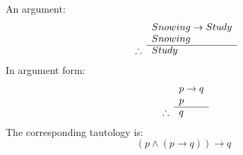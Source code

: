 \begin{example}
    An argument:
    \begin{equation*}
        \begin{array}{r l}
                       & Snowing \rightarrow Study \\
                       & Snowing                   \\
            \cline{2-2}
            \therefore & Study
        \end{array}
    \end{equation*}
    In argument form:
    \begin{equation*}
        \begin{array}{r l}
                       & p \rightarrow q \\
                       & p               \\
            \cline{2-2}
            \therefore & q
        \end{array}
    \end{equation*}
    The corresponding tautology is:
    \begin{equation*}
        (p \land (p \rightarrow q)) \rightarrow q
    \end{equation*}
\end{example}
